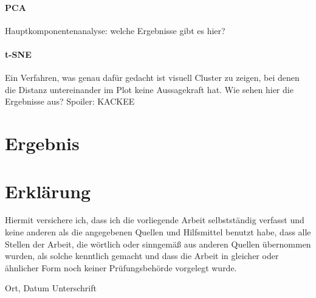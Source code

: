 \subsubsection*{PCA}
Hauptkomponentenanalyse: welche Ergebnisse gibt es hier?
\subsubsection*{t-SNE}
Ein Verfahren, was genau dafür gedacht ist visuell Cluster zu zeigen, bei denen die Distanz untereinander im Plot keine Aussagekraft hat. Wie sehen hier die Ergebnisse aus? Spoiler: KACKEE

\chapter{Ergebnis}




\chapter*{Erklärung}

Hiermit versichere ich, dass ich die vorliegende Arbeit selbstständig verfasst und keine anderen als die angegebenen Quellen und Hilfsmittel benutzt habe, dass alle Stellen der Arbeit, die wörtlich oder sinngemäß aus anderen Quellen übernommen wurden, als solche kenntlich gemacht und dass die Arbeit in gleicher oder ähnlicher Form noch keiner Prüfungsbehörde vorgelegt wurde.

\vspace{3cm}
Ort, Datum \hspace{5cm} Unterschrift\\

